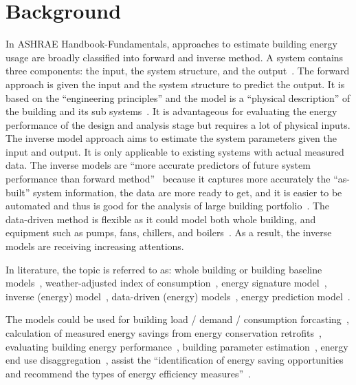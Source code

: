 \documentclass[12pt]{article}
\begin{document}
\section{Background}
In ASHRAE Handbook-Fundamentals, approaches to estimate building
energy usage are broadly classified into forward and inverse method. A
system contains three components: the input, the system structure, and
the output~\cite{edition2013ashrae}. The forward approach is given the
input and the system structure to predict the output. It is based on
the ``engineering principles'' and the model is a ``physical
description'' of the building and its sub
systems~\cite{edition2013ashrae}. It is advantageous for evaluating
the energy performance of the design and analysis stage but requires a
lot of physical inputs. The inverse model approach aims to estimate
the system parameters given the input and output. It is only
applicable to existing systems with actual measured data. The inverse
models are ``more accurate predictors of future system performance
than forward method''~\cite{edition2013ashrae} because it captures
more accurately the ``as-built'' system information, the data are more
ready to get, and it is easier to be automated and thus is good for
the analysis of large building portfolio~\cite{rabl1992energy}. The
data-driven method is flexible as it could model both whole building,
and equipment such as pumps, fans, chillers, and
boilers~\cite{edition2013ashrae}. As a result, the inverse models are
receiving increasing attentions.

In literature, the topic is referred to as: whole building or building
baseline models~\cite{granderson2014evaluation, reddy1997baselining,
  kissock2008methodology, dong2005applying, Zhang2015177},
weather-adjusted index of consumption~\cite{fels1986prism}, energy
signature model~\cite{rabl1992energy, hammarsten1987critical}, inverse
(energy) model~\cite{kissock2003, abushakra1997inverse, Zhang2015177},
data-driven (energy) models~\cite{Zhang2015177}, energy prediction
model~\cite{mocanu2016deep, Yu20101637, dong2005applying}.

The models could be used for building load / demand / consumption
forcasting~\cite{dong2005applying, solomon2011forecasting, Yu20101637,
  mocanu2016deep, hammarsten1987critical}, calculation of measured
energy savings from energy conservation retrofits~\cite{haberl1994bin,
  edition2013ashrae, kissock2008methodology, kissock2003,
  fels1986prism}, evaluating building energy
performance~\cite{abushakra1997inverse}, building parameter
estimation~\cite{hammarsten1987critical}, energy end use
disaggregation~\cite{leanEng, fels1986prism, wytock2013contextually},
assist the ``identification of energy saving opportunities and
recommend the types of energy efficiency measures''~\cite{leanEng}.
\end{document}
